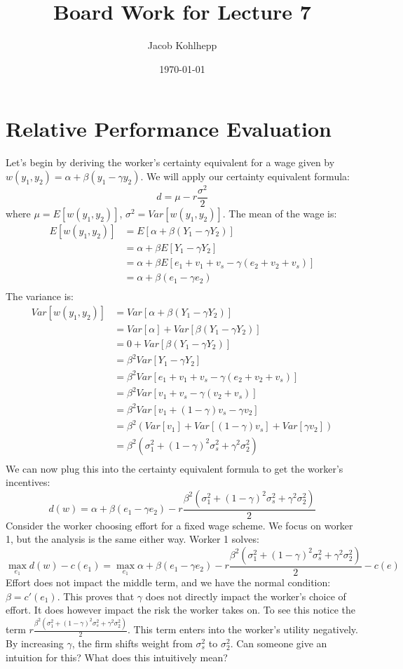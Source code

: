 \documentclass{article}
\title{Board Work for Lecture 7}
\author{Jacob Kohlhepp}
\date{\today}
\begin{document}
\maketitle


\section{Relative Performance Evaluation}

Let's begin by deriving the worker's certainty equivalent for a wage given by $w(y_1, y_2)=\alpha + \beta (y_1-\gamma y_2)$. We will apply our certainty equivalent formula:
\[d = \mu -r \frac{\sigma^2}{2}\]
where $\mu=E[w(y_1, y_2)]$, $\sigma^2=Var[w(y_1, y_2)]$. The mean of the wage is:
\begin{align}
    E[w(y_1, y_2)] &= E[\alpha + \beta (Y_1-\gamma Y_2)]\\
    &= \alpha +\beta E[Y_1-\gamma Y_2]\\
    &= \alpha +\beta E[e_1+v_1 + v_s-\gamma (e_2+v_2+v_s)]\\
    &= \alpha +\beta (e_1-\gamma e_2)\\
\end{align}
The variance is:
\begin{align*}
    Var[w(y_1, y_2)] &= Var[\alpha + \beta (Y_1-\gamma Y_2)]\\
    &= Var[\alpha]  + Var[\beta (Y_1-\gamma Y_2)]\\
     &= 0 + Var[\beta (Y_1-\gamma Y_2)]\\
    &= \beta^2 Var[Y_1-\gamma Y_2]\\
    &= \beta^2 Var[e_1+v_1 + v_s-\gamma (e_2+v_2+v_s)]\\
    &= \beta^2 Var[v_1 + v_s-\gamma (v_2+v_s)]\\
    &= \beta^2 Var[v_1 + (1-\gamma )v_s-\gamma v_2]\\
    &= \beta^2 ( Var[v_1]+ Var[ (1-\gamma )v_s]+Var[\gamma v_2])\\
    &= \beta^2 ( \sigma_1^2+ (1-\gamma)^2\sigma_s^2 +\gamma^2 \sigma_2^2 )\\
\end{align*}
We can now plug this into the certainty equivalent formula to get the worker's incentives:
\[d(w)=\alpha +\beta (e_1-\gamma e_2) -r \frac{\beta^2 ( \sigma_1^2+ (1-\gamma)^2\sigma_s^2 +\gamma^2 \sigma_2^2 )}{2}\]
Consider the worker choosing effort for a fixed wage scheme. We focus on worker 1, but the analysis is the same either way. Worker 1 solves:
\[\max_{e_1} d(w)-c(e_1)=\max_{e_1} \alpha +\beta (e_1-\gamma e_2) -r \frac{\beta^2 ( \sigma_1^2+ (1-\gamma)^2\sigma_s^2 +\gamma^2 \sigma_2^2 )}{2} -c(e)\]
Effort does not impact the middle term, and we have the normal condition: $\beta = c'(e_1)$. This proves that $\gamma$ does not directly impact the worker's choice of effort. It does however impact the risk the worker takes on. To see this notice the term $r \frac{\beta^2 ( \sigma_1^2+ (1-\gamma)^2\sigma_s^2 +\gamma^2 \sigma_2^2 )}{2}$. This term enters into the worker's utility negatively. By increasing $\gamma$, the firm shifts weight from $\sigma_s^2$ to $\sigma^2_2$. Can someone give an intuition for this? What does this intuitively mean?
\end{document}
